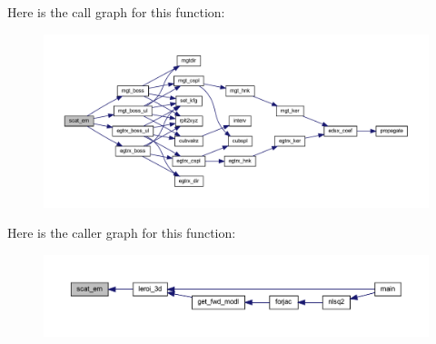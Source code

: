 Here is the call graph for this function\+:\nopagebreak
\begin{figure}[H]
\begin{center}
\leavevmode
\includegraphics[width=350pt]{Leroi_8f90_a75fe85be755349539d5b76874d678237_cgraph}
\end{center}
\end{figure}
Here is the caller graph for this function\+:\nopagebreak
\begin{figure}[H]
\begin{center}
\leavevmode
\includegraphics[width=350pt]{Leroi_8f90_a75fe85be755349539d5b76874d678237_icgraph}
\end{center}
\end{figure}
\mbox{\label{Leroi_8f90_ace4eaf8c1fdfc5cad3e2a93e77642139}} 
